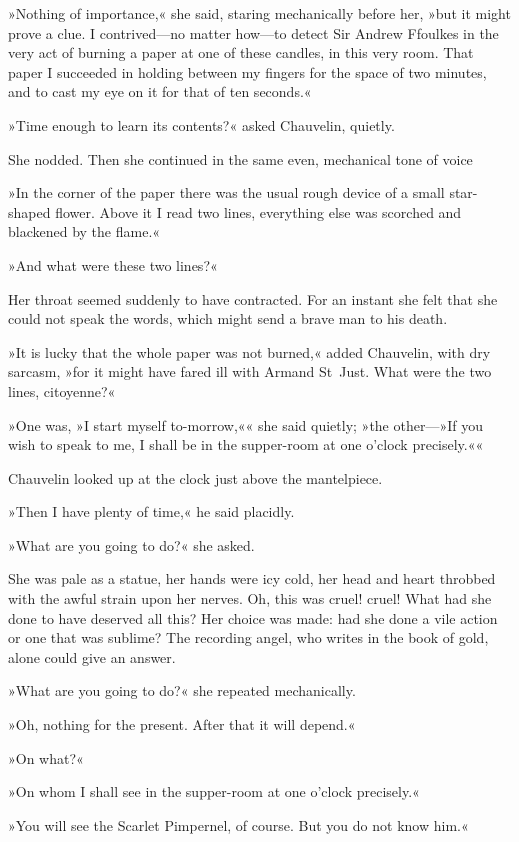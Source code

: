 »Nothing of importance,« she said, staring mechanically before her, »but it might prove a clue. I contrived—no matter how—to detect Sir Andrew Ffoulkes in the very act of burning a paper at one of these candles, in this very room. That paper I succeeded in holding between my fingers for the space of two minutes, and to cast my eye on it for that of ten seconds.«

»Time enough to learn its contents?« asked Chauvelin, quietly.

She nodded. Then she continued in the same even, mechanical tone of voice\longdash


»In the corner of the paper there was the usual rough device of a small star-shaped flower. Above it I read two lines, everything else was scorched and blackened by the flame.«

»And what were these two lines?«

Her throat seemed suddenly to have contracted. For an instant she felt that she could not speak the words, which might send a brave man to his death.

»It is lucky that the whole paper was not burned,« added Chauve\-lin, with dry sarcasm, »for it might have fared ill with Armand St~Just. What were the two lines, citoyenne?«

»One was, »I start myself to-morrow,«« she said quietly; »the other—\allowbreak»If you wish to speak to me, I shall be in the supper-room at one o'clock precisely.««

Chauvelin looked up at the clock just above the mantelpiece.

»Then I have plenty of time,« he said placidly.

»What are you going to do?« she asked.

She was pale as a statue, her hands were icy cold, her head and heart throbbed with the awful strain upon her nerves. Oh, this was cruel! cruel! What had she done to have deserved all this? Her choice was made: had she done a vile action or one that was sublime? The recording angel, who writes in the book of gold, alone could give an answer.

»What are you going to do?« she repeated mechanically.

»Oh, nothing for the present. After that it will depend.«

»On what?«

»On whom I shall see in the supper-room at one o'clock precisely.«

»You will see the Scarlet Pimpernel, of course. But you do not know him.«

